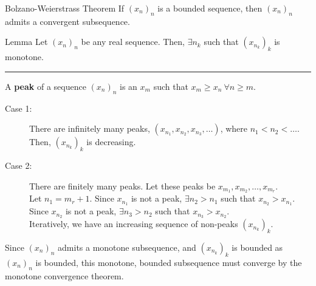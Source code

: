 \documentclass[10pt]{extarticle}
\begin{document}
  \begin{problem}{Bolzano-Weierstrass Theorem}
    If $(x_n)_n$ is a bounded sequence, then $(x_n)_n$ admits a convergent subsequence.
    \begin{problem}{Lemma}
      Let $(x_n)_n$ be any real sequence. Then, $\exists n_k$ such that $(x_{n_k})_k$ is monotone.\\
      \vspace{4pt}
      \rule{\textwidth}{0.4pt}
      \vspace{4pt}
      A \textbf{peak} of a sequence $(x_n)_n$ is an $x_m$ such that $x_m \geq x_n~\forall n\geq m$.
      \tcblower
      \begin{description}
        \item[Case 1:] There are infinitely many peaks, $(x_{n_1}, x_{n_2},x_{n_3},\dots)$, where $n_1 < n_2 < \dots$. Then, $\left(x_{n_k}\right)_k$ is decreasing.
        \item[Case 2:] There are finitely many peaks. Let these peaks be $x_{m_1},x_{m_2},\dots,x_{m_r}$.\\

          Let $n_1 = m_r + 1$. Since $x_{n_1}$ is not a peak, $\exists n_2 > n_1$ such that $x_{n_2} > x_{n_1}$. Since $x_{n_2}$ is not a peak, $\exists n_3 > n_2$ such that $x_{n_3} > x_{n_2}$.\\

          Iteratively, we have an increasing sequence of non-peaks $(x_{n_k})_k$.
      \end{description}
    \end{problem}
    \tcblower
    Since $(x_n)_n$ admits a monotone subsequence, and $(x_{n_k})_k$ is bounded as $(x_n)_n$ is bounded, this monotone, bounded subsequence must converge by the monotone convergence theorem.
  \end{problem}
\end{document}
